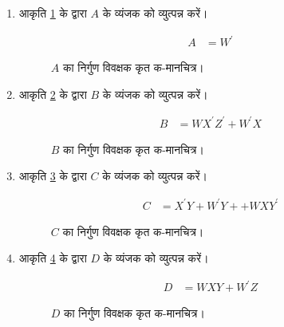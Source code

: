 \renewcommand{\theequation}{\theenumi}
\renewcommand{\thefigure}{\theenumi}
\begin{enumerate}[label=\thesubsection.\arabic*.,ref=\thesubsection.\theenumi]

\item आकृति \ref{fig:inc_kmapX_A} के द्वारा $A$ के व्यंजक को व्युत्पन्न करें।

\solution

\begin{align}
\label{eq:kmapX_disp_A}
A &= W^{\prime}
\end{align}
%

\begin{figure}[!ht]
\centering
\resizebox{\columnwidth}{!} {

}
\caption{$A$ का निर्गुण विवक्षक कृत क-मानचित्र।}
\label{fig:inc_kmapX_A}
\end{figure}
%

\item आकृति \ref{fig:inc_kmapX_B} के द्वारा $B$ के व्यंजक को व्युत्पन्न करें।

\solution

\begin{align}
\label{eq:kmapX_disp_B}
B &= WX^{\prime}Z^{\prime}+W^{\prime}X
\end{align}
%

\begin{figure}[!ht]
\centering
\resizebox{\columnwidth}{!} {

}
\caption{$B$ का निर्गुण विवक्षक कृत क-मानचित्र।}
\label{fig:inc_kmapX_B}
\end{figure}
%
\item आकृति \ref{fig:inc_kmapX_C} के द्वारा $C$ के व्यंजक को व्युत्पन्न करें।

\solution

\begin{align}
\label{eq:kmapX_disp_C}
C &= X^{\prime}Y+W^{\prime}Y++WXY^{\prime}
\end{align}
%

\begin{figure}[!ht]
\centering
\resizebox{\columnwidth}{!} {

}
\caption{$C$ का निर्गुण विवक्षक कृत क-मानचित्र।}
\label{fig:inc_kmapX_C}
\end{figure}
%
%
\item आकृति \ref{fig:inc_kmapX_D} के द्वारा $D$ के व्यंजक को व्युत्पन्न करें।

\solution

\begin{align}
\label{eq:kmapX_disp_D}
D &= WXY+W^{\prime}Z
\end{align}
%

\begin{figure}[!ht]
\centering
\resizebox{\columnwidth}{!} {

}
\caption{$D$ का निर्गुण विवक्षक कृत क-मानचित्र।}
\label{fig:inc_kmapX_D}
\end{figure}
%

\end{enumerate}
